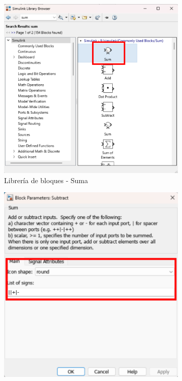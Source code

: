 \begin{figure}[htbp]
    \centering
    \begin{subfigure}[b]{0.35\textwidth}
        \centering
        \includegraphics[width=\textwidth]{fig/Capitulo5/Caso_de_estudio_IMU/Generador_de_salidas/libreia_de_bloques_suma.pdf}
        \caption{Librería de bloques - Suma}
        \label{fig:lib_bloques_add_IMU}
    \end{subfigure}
    \hfill
    \begin{subfigure}[b]{0.45\textwidth}
        \centering
        \includegraphics[width=\textwidth]{fig/Capitulo5/Caso_de_estudio_IMU/Generador_de_salidas/configuracion_bloque_suma.pdf}

\end{subfigure}
\end{figure}
